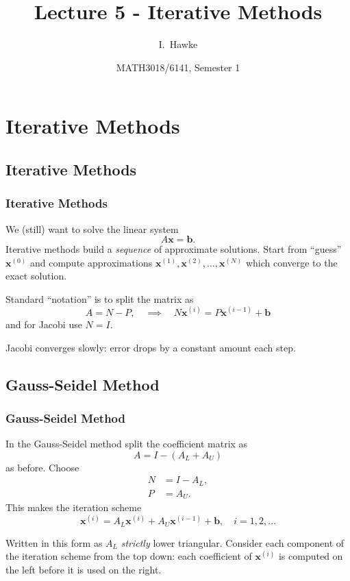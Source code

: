 \documentclass{beamer}
\title[Lecture 5] %
{Lecture 5 - Iterative Methods}
\author[I. Hawke]{I.~Hawke}
\institute[University of Southampton]%
{
  School of Mathematics, \\
  University of Southampton, UK
}
\date[Semester 1]{MATH3018/6141, Semester 1}
\newcommand{\bb}{{\boldsymbol{b}}}
\newcommand{\bx}{{\boldsymbol{x}}}
\begin{document}
\begin{frame}
  \titlepage
\end{frame}

\section{Iterative Methods}

\subsection{Iterative Methods}

\begin{frame}
  \frametitle{Iterative Methods}

   We (still) want to solve the linear system
   \begin{equation*}
     A \bx = \bb.
   \end{equation*}
   Iterative methods build a \emph{sequence} of approximate
   solutions. Start from ``guess'' $\bx^{(0)}$ and compute
   approximations $\bx^{(1)}, \bx^{(2)}, \dots, \bx^{(N)}$ which
   converge to the exact solution. \pause

   \vspace{1ex}

   Standard ``notation'' is to split the matrix as
   \begin{equation*}
     A = N - P, \quad \implies \quad N \bx^{(i)} = P \bx^{(i - 1)} + \bb
   \end{equation*}
   and for Jacobi use $N=I$. \pause

   \vspace{1ex}

   Jacobi converges slowly: error drops by a constant amount each step.

\end{frame}

\subsection{Gauss-Seidel Method}

\begin{frame}
  \frametitle{Gauss-Seidel Method}

  In the Gauss-Seidel method split the coefficient matrix as
  \begin{equation*}
    A = I - (A_L + A_U)
  \end{equation*}
  as before. Choose
  \begin{align*}
    N & = I - A_L, \\
    P & = A_U.
  \end{align*}
  This makes the iteration scheme
  \begin{equation*}
    \bx^{(i)} =  A_L \bx^{(i)} + A_U \bx^{(i - 1)} + \bb, \quad i = 1,
    2, \dots
  \end{equation*} \pause

  Written in this form as $A_L$ \emph{strictly} lower
  triangular. Consider each component of the iteration scheme from the
  top down: each coefficient of $\bx^{(i)}$ is computed on the left
  before it is used on the right.

\end{frame}
\end{document}
